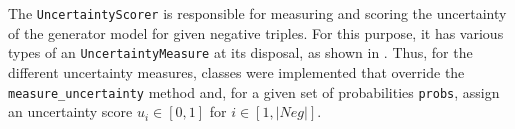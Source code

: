 The \texttt{UncertaintyScorer} is responsible for measuring and scoring the uncertainty of the generator model for given negative triples.
For this purpose, it has various types of an \texttt{UncertaintyMeasure} at its disposal, as shown in .
Thus, for the different uncertainty measures, classes were implemented that override the \texttt{measure\_uncertainty} method and, for a given set of probabilities \texttt{probs}, assign an uncertainty score $u_i \in [0,1]$ for $i \in [1, |Neg|]$.